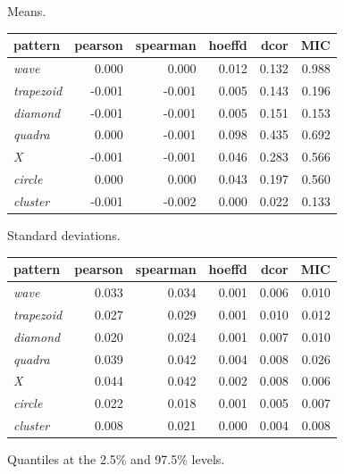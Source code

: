 \documentclass[english,nohyper,titlepage]{tufte-handout}\usepackage{graphicx, color}
\begin{document}
\footnotesize{
Means.\\
\begin{tabular}{lrrrrr}

pattern & pearson & spearman & hoeffd & dcor & MIC \\
\hline
\emph{wave} & 0.000 & 0.000 & 0.012 & 0.132 & 0.988 \\
\emph{trapezoid} & -0.001 & -0.001 & 0.005 & 0.143 & 0.196 \\
\emph{diamond} & -0.001 & -0.001 & 0.005 & 0.151 & 0.153 \\
\emph{quadra} & 0.000 & -0.001 & 0.098 & 0.435 & 0.692 \\
\emph{X} & -0.001 & -0.001 & 0.046 & 0.283 & 0.566 \\
\emph{circle} & 0.000 & 0.000 & 0.043 & 0.197 & 0.560 \\
\emph{cluster} & -0.001 & -0.002 & 0.000 & 0.022 & 0.133 \\
\hline
\end{tabular}

\vspace{.25cm}
\noindent Standard deviations.\\
\begin{tabular}{lrrrrr}
pattern & pearson & spearman & hoeffd & dcor & MIC \\
\hline
\emph{wave} & 0.033 & 0.034 & 0.001 & 0.006 & 0.010 \\
\emph{trapezoid} & 0.027 & 0.029 & 0.001 & 0.010 & 0.012 \\
\emph{diamond} & 0.020 & 0.024 & 0.001 & 0.007 & 0.010 \\
\emph{quadra} & 0.039 & 0.042 & 0.004 & 0.008 & 0.026 \\
\emph{X} & 0.044 & 0.042 & 0.002 & 0.008 & 0.006 \\
\emph{circle} & 0.022 & 0.018 & 0.001 & 0.005 & 0.007 \\
\emph{cluster} & 0.008 & 0.021 & 0.000 & 0.004 & 0.008 \\
\hline
\end{tabular}


\vspace{.25cm}
\noindent Quantiles at the 2.5\% and 97.5\% levels.\\

}
\end{document}
